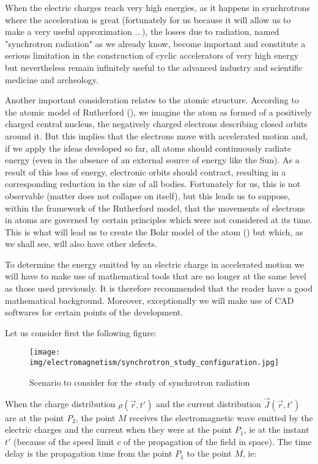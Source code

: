 	When the electric charges reach very high energies, as it happens in synchrotrons where the acceleration is great (fortunately for us because it will allow us to make a very useful approximation ...), the losses due to radiation, named "synchrotron radiation" as we already know, become important and constitute a serious limitation in the construction of cyclic accelerators of very high energy but nevertheless remain infinitely useful to the advanced industry and scientific medicine and archeology.

	Another important consideration relates to the atomic structure. According to the atomic model of Rutherford (), we imagine the atom as formed of a positively charged central nucleus, the negatively charged electrons describing closed orbits around it. But this implies that the electrons move with accelerated motion and, if we apply the ideas developed so far, all atoms should continuously radiate energy (even in the absence of an external source of energy like the Sun). As a result of this loss of energy, electronic orbits should contract, resulting in a corresponding reduction in the size of all bodies. Fortunately for us, this is not observable (matter does not collapse on itself), but this leads us to suppose, within the framework of the Rutherford model, that the movements of electrons in atoms are governed by certain principles which were not considered at its time. This is what will lead us to create the Bohr model of the atom () but which, as we shall see, will also have other defects.

	To determine the energy emitted by an electric charge in accelerated motion we will have to make use of mathematical tools that are no longer at the same level as those used previously. It is therefore recommended that the reader have a good mathematical background. Moreover, exceptionally we will make use of CAD softwares for certain points of the development.

	Let us consider first the following figure:
	\begin{figure}[H]
		\centering
		\texttt{[image: img/electromagnetism/synchrotron\_study\_configuration.jpg]}
		\caption[]{Scenario to consider for the study of synchrotron radiation}
	\end{figure}
	When the charge distribution $\rho(\vec{r},t')$ and the current distribution $\vec{J}(\vec{r},t')$ are at the point $P_2$, the point $M$ receives the electromagnetic wave emitted by the electric charges and the current when they were at the point $P_1$, ie at the instant $t'$ (because of the speed limit $c$ of the propagation of the field in space). The time delay is the propagation time from the point $P_1$ to the point $M$, ie:
	
